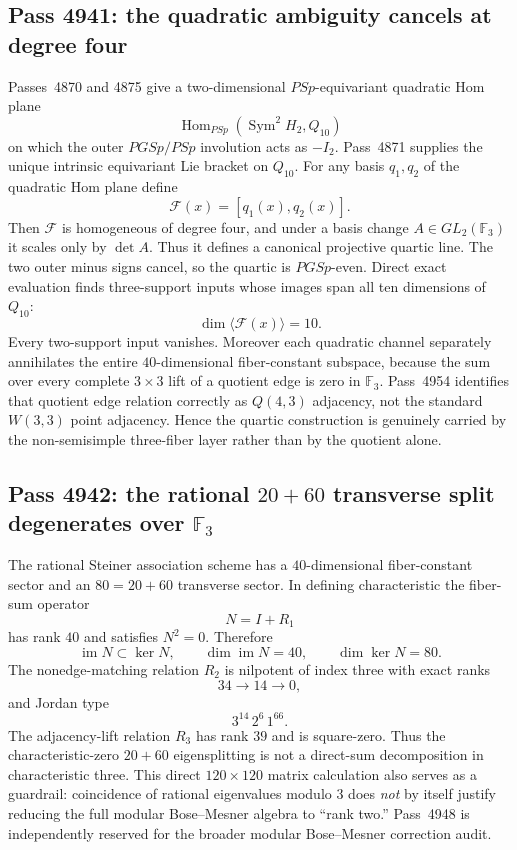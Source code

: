 \subsection{Pass 4941: the quadratic ambiguity cancels at degree four}
Passes~4870 and 4875 give a two-dimensional $PSp$-equivariant quadratic Hom
plane
\[
  \operatorname{Hom}_{PSp}(\operatorname{Sym}^2H_2,Q_{10})
\]
on which the outer $PGSp/PSp$ involution acts as $-I_2$.  Pass~4871 supplies
the unique intrinsic equivariant Lie bracket on $Q_{10}$.  For any basis
$q_1,q_2$ of the quadratic Hom plane define
\[
  \mathcal F(x)=[q_1(x),q_2(x)].
\]
Then $\mathcal F$ is homogeneous of degree four, and under a basis change
$A\in GL_2(\mathbb F_3)$ it scales only by $\det A$.  Thus it defines a
canonical projective quartic line.  The two outer minus signs cancel, so the
quartic is $PGSp$-even.  Direct exact evaluation finds three-support inputs
whose images span all ten dimensions of $Q_{10}$:
\[
  \boxed{\dim\langle\mathcal F(x)\rangle=10.}
\]
Every two-support input vanishes.  Moreover each quadratic channel separately
annihilates the entire $40$-dimensional fiber-constant subspace, because the
sum over every complete $3\times3$ lift of a quotient edge is zero in
$\mathbb F_3$.  Pass~4954 identifies that quotient edge relation correctly as
$Q(4,3)$ adjacency, not the standard $W(3,3)$ point adjacency.  Hence the
quartic construction is genuinely carried by the non-semisimple three-fiber
layer rather than by the quotient alone.

\subsection{Pass 4942: the rational $20+60$ transverse split degenerates over $\mathbb F_3$}
The rational Steiner association scheme has a $40$-dimensional fiber-constant
sector and an $80=20+60$ transverse sector.  In defining characteristic the
fiber-sum operator
\[
  N=I+R_1
\]
has rank $40$ and satisfies $N^2=0$.  Therefore
\[
  \operatorname{im}N\subset\ker N,
  \qquad \dim\operatorname{im}N=40,
  \qquad \dim\ker N=80.
\]
The nonedge-matching relation $R_2$ is nilpotent of index three with exact ranks
\[
  34\longrightarrow14\longrightarrow0,
\]
and Jordan type
\[
  \boxed{3^{14}\,2^6\,1^{66}.}
\]
The adjacency-lift relation $R_3$ has rank $39$ and is square-zero.  Thus the
characteristic-zero $20+60$ eigensplitting is not a direct-sum decomposition
in characteristic three.  This direct $120\times120$ matrix calculation also
serves as a guardrail: coincidence of rational eigenvalues modulo $3$ does
\emph{not} by itself justify reducing the full modular Bose--Mesner algebra to
``rank two.''  Pass~4948 is independently reserved for the broader modular
Bose--Mesner correction audit.

